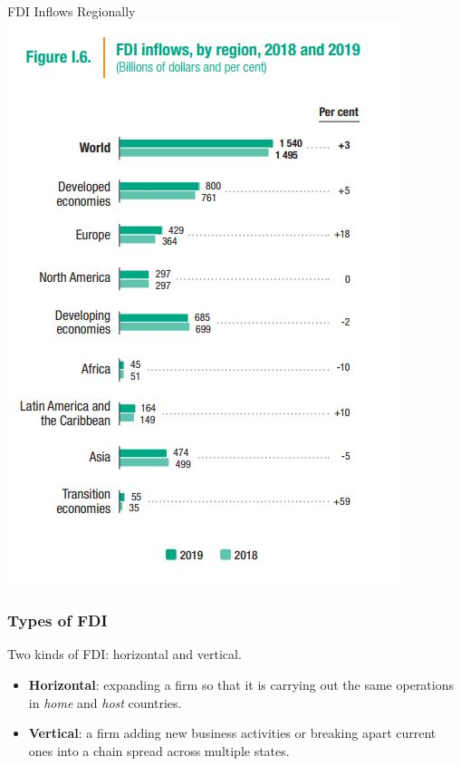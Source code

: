 \documentclass[handout]{beamer}
\begin{document}
\begin{frame}{\LARGE FDI Inflows Regionally}
	\centering
	\includegraphics[width=\textwidth,height=0.9\textheight,keepaspectratio]{FDI inflows by region.JPG}
\end{frame}

\begin{frame} 
	\frametitle{\LARGE{Types of FDI}}
	Two kinds of FDI: horizontal and vertical.
	\begin{itemize}
		\item \textbf{Horizontal}: expanding a firm so that it is carrying out the same operations in \textit{home} and \textit{host} countries. \pause
		\item \textbf{Vertical}: a firm adding new business activities or breaking apart current ones into a chain spread across multiple states.
	\end{itemize}
\end{frame}
\end{document}
